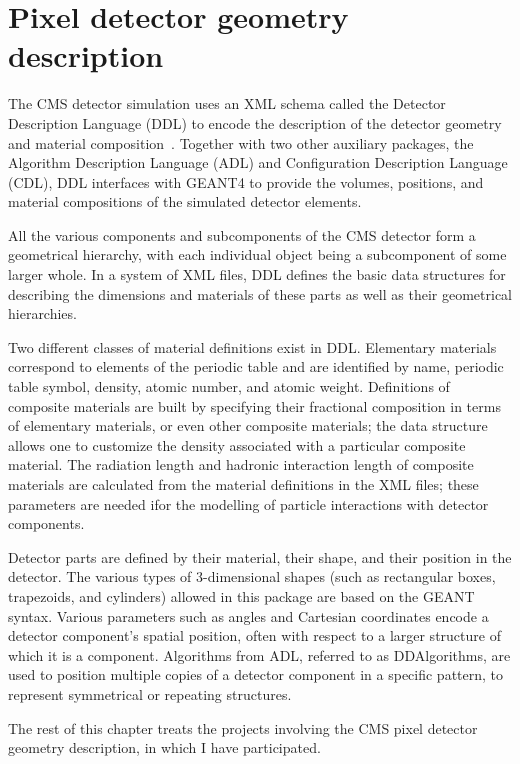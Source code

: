 \chapter{Pixel detector geometry description\label{sec:matbudg}}

The CMS detector simulation uses an XML schema called the Detector Description Language (DDL) to encode the description of the detector geometry and material composition~\cite{CMS_AN_2005-000}. Together with two other auxiliary packages, the Algorithm Description Language (ADL) and Configuration Description Language (CDL), DDL interfaces with GEANT4 to provide the volumes, positions, and material compositions of the simulated detector elements.

All the various components and subcomponents of the CMS detector form a geometrical hierarchy, with each individual object being a subcomponent of some larger whole. In a system of XML files, DDL defines the basic data structures for describing the dimensions and materials of these parts as well as their geometrical hierarchies.

Two different classes of material definitions exist in DDL. Elementary materials correspond to elements of the periodic table and are identified by name, periodic table symbol, density, atomic number, and atomic weight. Definitions of composite materials are built by specifying their fractional composition in terms of elementary materials, or even other composite materials; the data structure allows one to customize the density associated with a particular composite material. The radiation length and hadronic interaction length of composite materials are calculated from the material definitions in the XML files; these parameters are needed ifor the modelling of particle interactions with detector components.

Detector parts are defined by their material, their shape, and their position in the detector. The various types of 3-dimensional shapes (such as rectangular boxes, trapezoids, and cylinders) allowed in this package are based on the GEANT syntax. Various parameters such as angles and Cartesian coordinates encode a detector component's spatial position, often with respect to a larger structure of which it is a component. Algorithms from ADL, referred to as DDAlgorithms, are used to position multiple copies of a detector component in a specific pattern, to represent symmetrical or repeating structures.

The rest of this chapter treats the projects involving the CMS pixel detector geometry description, in which I have participated.

